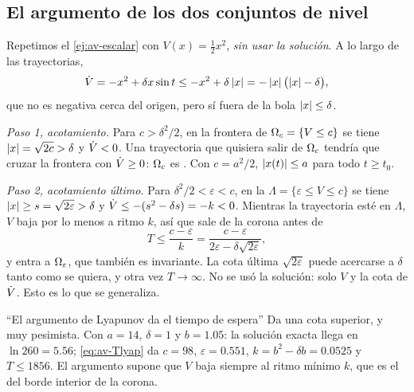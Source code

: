 \subsection{El argumento de los dos conjuntos de nivel}

Repetimos el \cref{ej:av-escalar} con $V(x)=\tfrac12x^2$, \emph{sin usar la solución}. A lo largo de las trayectorias,
\[
  \dot V=-x^2+\delta x\sin t\le-x^2+\delta\left\lvert x\right\rvert=-\left\lvert x\right\rvert\bigl(\left\lvert x\right\rvert-\delta\bigr),
\]
que no es negativa cerca del origen, pero sí fuera de la bola $\left\lvert x\right\rvert\le\delta$.

\emph{Paso 1, acotamiento.} Para $c>\delta^2/2$, en la frontera de $\Omega_{c}=\{V\le c\}$ se tiene $\left\lvert x\right\rvert=\sqrt{2c}>\delta$ y $\dot V<0$. Una trayectoria que quisiera salir de $\Omega_{c}$ tendría que cruzar la frontera con $\dot V\ge0$: $\Omega_{c}$ es . Con $c=a^2/2$, $\left\lvert x(t)\right\rvert\le a$ para todo $t\ge t_0$.

\emph{Paso 2, acotamiento último.} Para $\delta^2/2<\varepsilon<c$, en la  $\Lambda=\{\varepsilon\le V\le c\}$ se tiene $\left\lvert x\right\rvert\ge s=\sqrt{2\varepsilon}>\delta$ y $\dot V\le-(s^2-\delta s)=-k<0$. Mientras la trayectoria esté en $\Lambda$, $V$ baja por lo menos a ritmo $k$, así que sale de la corona antes de
\begin{equation}
  T\le\frac{c-\varepsilon}{k}=\frac{c-\varepsilon}{2\varepsilon-\delta\sqrt{2\varepsilon}},
  \label{eq:av-Tlyap}
\end{equation}
y entra a $\Omega_{\varepsilon}$, que también es invariante. La cota última $\sqrt{2\varepsilon}$ puede acercarse a $\delta$ tanto como se quiera, y otra vez $T\to\infty$. No se usó la solución: solo $V$ y la cota de $\dot V$. Esto es lo que se generaliza.

\begin{trampa}[label=tr:av-T]{``El argumento de Lyapunov da el tiempo de espera''}
Da una cota superior, y muy pesimista. Con $a=14$, $\delta=1$ y $b=1.05$: la solución exacta llega en $\ln260=5.56$; \eqref{eq:av-Tlyap} da $c=98$, $\varepsilon=0.551$, $k=b^2-\delta b=0.0525$ y $T\le1856$. El argumento supone que $V$ baja siempre al ritmo mínimo $k$, que es el del borde interior de la corona.
\end{trampa}

